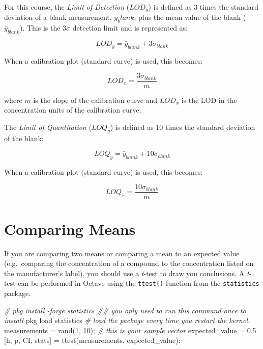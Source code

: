 \documentclass[]{tufte-book}
\newenvironment{Shaded}{}{}
\newcommand{\BuiltInTok}[1]{#1}
\newcommand{\CommentTok}[1]{\textcolor[rgb]{0.38,0.63,0.69}{\textit{#1}}}
\newcommand{\FloatTok}[1]{\textcolor[rgb]{0.25,0.63,0.44}{#1}}
\newcommand{\FunctionTok}[1]{\textcolor[rgb]{0.02,0.16,0.49}{#1}}
\newcommand{\NormalTok}[1]{#1}
\newcommand{\OperatorTok}[1]{\textcolor[rgb]{0.40,0.40,0.40}{#1}}
\begin{document}
For this course, the \emph{Limit of Detection} (\(LOD_y\)) is defined as 3 times the standard deviation of a blank measurement, \(y_blank\), plus the mean value of the blank (\(\bar{y}_{blank}\)). This is the 3\(\sigma\) detection limit and is represented as:

\[
LOD_y = \bar{y}_{blank} + 3\sigma_{blank}
\]

When a calibration plot (standard curve) is used, this becomes:

\[
LOD_x = \frac{3\sigma_{blank}}{m}
\]

\noindent where \(m\) is the slope of the calibration curve and \(LOD_x\) is the LOD in the concentration units of the calibration curve.

The \emph{Limit of Quantitation} (\(LOQ_y\)) is defined as 10 times the standard deviation of the blank:

\[
LOQ_y = \bar{y}_{blank} + 10\sigma_{blank}
\]

When a calibration plot (standard curve) is used, this becomes:

\[
LOQ_x = \frac{10\sigma_{blank}}{m}
\]

\hypertarget{comparing-means}{%
\section*{Comparing Means}\label{comparing-means}}

If you are comparing two means or comparing a mean to an expected value (e.g.~comparing the concentration of a compound to the concentration listed on the manufacturer's label), you should use a \emph{t}-test to draw you conclusions. A \emph{t}-test can be performed in Octave using the \texttt{ttest()} function from the \texttt{statistics} package.

\begin{Shaded}
\begin{Highlighting}[]
\CommentTok{# pkg install -forge statistics ## you only need to run this command once to install}
\FunctionTok{pkg} \BuiltInTok{load} \FunctionTok{statistics} \CommentTok{# load the package every time you restart the kernel.}
\NormalTok{measurements }\OperatorTok{=} \FunctionTok{rand}\NormalTok{(}\FloatTok{1}\OperatorTok{,} \FloatTok{10}\NormalTok{)}\OperatorTok{;} \CommentTok{# this is your sample vector}
\NormalTok{expected_value }\OperatorTok{=} \FloatTok{0.5}
\NormalTok{[h}\OperatorTok{,}\NormalTok{ p}\OperatorTok{,}\NormalTok{ CI}\OperatorTok{,}\NormalTok{ stats] }\OperatorTok{=}\NormalTok{ ttest(measurements}\OperatorTok{,}\NormalTok{ expected_value)}\OperatorTok{;}
\end{Highlighting}
\end{Shaded}
\end{document}
